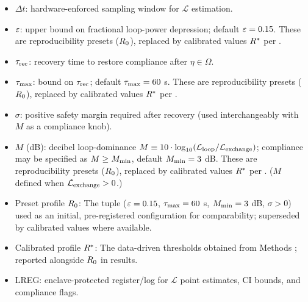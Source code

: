 \documentclass[11pt]{article}
\begin{document}
\begin{itemize}
\item $\Delta t$: hardware-enforced sampling window for $\mathcal{L}$ estimation.
\item $\varepsilon$: upper bound on fractional loop-power depression; default $\varepsilon = 0.15$. These are reproducibility presets ($R_0$), replaced by calibrated values $R^*$ per .
\item $\tau_{\text{rec}}$: recovery time to restore compliance after $\eta\in\Omega$.
\item $\tau_{\max}$: bound on $\tau_{\text{rec}}$; default $\tau_{\max} = 60$ s. These are reproducibility presets ($R_0$), replaced by calibrated values $R^*$ per .
\item $\sigma$: positive safety margin required after recovery (used interchangeably with $M$ as a compliance knob).
\item $M$ (dB): decibel loop-dominance $M \equiv 10\cdot\log_{10}(\mathcal{L}_{\text{loop}}/\mathcal{L}_{\text{exchange}})$; compliance may be specified as $M \geq M_{\min}$, default $M_{\min} = 3$ dB. These are reproducibility presets ($R_0$), replaced by calibrated values $R^*$ per . ($M$ defined when $\mathcal{L}_{\text{exchange}}>0$.)
\item Preset profile $R_0$: The tuple ($\varepsilon=0.15$, $\tau_{\max}=60$ s, $M_{\min}=3$ dB, $\sigma>0$) used as an initial, pre-registered configuration for comparability; superseded by calibrated values where available.
\item Calibrated profile $R^*$: The data-driven thresholds obtained from Methods ; reported alongside $R_0$ in results.
\item LREG: enclave-protected register/log for $\mathcal{L}$ point estimates, CI bounds, and compliance flags.
\end{itemize}
\end{document}

